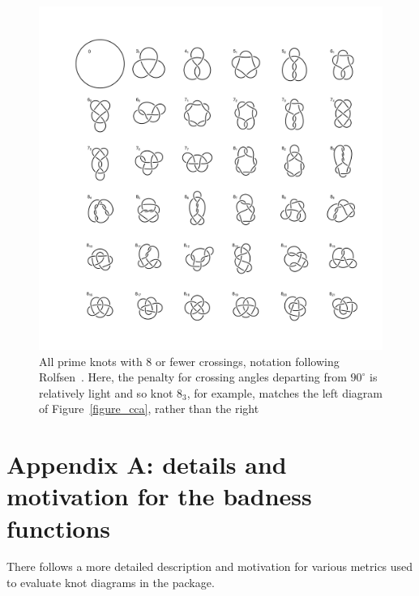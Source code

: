\documentclass{birkjour}
\theoremstyle{definition}
\theoremstyle{remark}
\numberwithin{equation}{section}
\begin{document}
\begin{figure}[htbp]
  \begin{center}
\includegraphics[width=13cm]{knots_to_8crossings}  %
\caption{All \label{all8} prime knots with 8 or fewer crossings,
  notation following Rolfsen~\cite{rolfsen1976}.  Here, the penalty
  for crossing angles departing from $90^\circ$ is relatively light
  and so knot $8_3$, for example, matches the left diagram of
  Figure~\ref{figure_cca}, rather than the right}
  \end{center}
\end{figure}




\clearpage
\section*{Appendix A: details and motivation for the badness functions}

There follows a more detailed description and motivation for various
metrics used to evaluate knot diagrams in the package.
\end{document}
